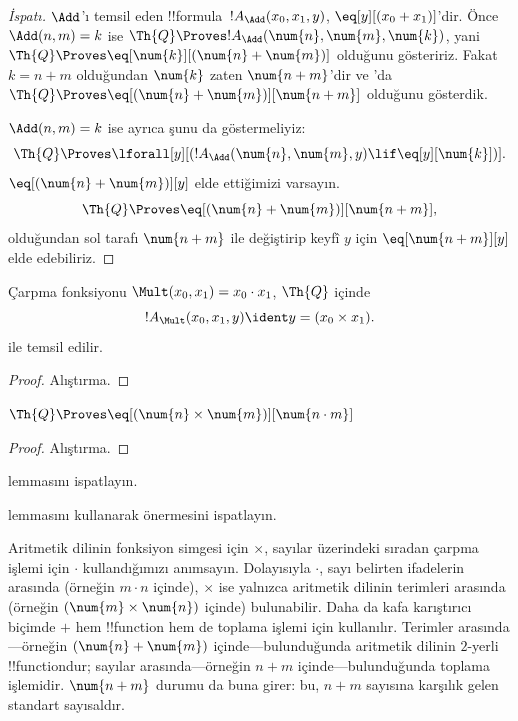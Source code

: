\documentclass[../../../include/open-logic-section]{subfiles}
\begin{document}
\begin{proof}[ İspatı]
$\Add$'ı temsil eden !!{formula}~$!A_\Add(x_0,x_1,y)$,
$\eq[y][(x_0+x_1)]$'dir. Önce $\Add(n,m)=k$ ise
$\Th{Q} \Proves !A_\Add(\num{n},\num{m},\num{k})$, yani
$\Th{Q} \Proves \eq[\num{k}][(\num{n}+\num{m})]$ olduğunu gösteririz.
Fakat $k=n+m$ olduğundan $\num{k}$ zaten $\num{n+m}$'dir ve
'da
$\Th{Q} \Proves \eq[(\num{n}+\num{m})][\num{n+m}]$ olduğunu gösterdik.

$\Add(n,m)=k$ ise ayrıca şunu da göstermeliyiz:
\[
\Th{Q} \Proves \lforall[y][(!A_\Add(\num{n}, \num{m}, y) \lif
  \eq[y][\num{k}])].
\]
$\eq[(\num{n}+\num{m})][y]$ elde ettiğimizi varsayın.
\[
\Th{Q} \Proves \eq[(\num{n}+\num{m})][\num{n+m}],
\]
olduğundan sol tarafı $\num{n+m}$ ile değiştirip keyfî $y$ için
$\eq[\num{n+m}][y]$ elde edebiliriz.
\end{proof}

\begin{prop}
Çarpma fonksiyonu $\Mult(x_0,x_1)=x_0\cdot x_1$, $\Th{Q}$ içinde
\[
  !A_{\Mult}(x_0, x_1, y) \ident y = (x_0 \times x_1).
\]
ile temsil edilir.
\end{prop}

\begin{proof} Alıştırma. \end{proof}

\begin{lem}
$\Th{Q} \Proves \eq[(\num{n} \times \num{m})][\num{n \cdot m}]$
\end{lem}

\begin{proof} Alıştırma. \end{proof}

\begin{prob}
 lemmasını ispatlayın.
\end{prob}

\begin{prob}
 lemmasını kullanarak
 önermesini ispatlayın.
\end{prob}

\begin{explain}
  Aritmetik dilinin fonksiyon simgesi için $\times$, sayılar üzerindeki
  sıradan çarpma işlemi için $\cdot$ kullandığımızı anımsayın. Dolayısıyla
  $\cdot$, sayı belirten ifadelerin arasında (örneğin $m\cdot n$ içinde),
  $\times$ ise yalnızca aritmetik dilinin terimleri arasında (örneğin
  $(\num{m}\times\num{n})$ içinde) bulunabilir. Daha da kafa karıştırıcı
  biçimde $+$ hem !!{function} hem de toplama işlemi için kullanılır.
  Terimler arasında---örneğin $(\num{n}+\num{m})$ içinde---bulunduğunda
  aritmetik dilinin $2$-yerli !!{function}{}dur; sayılar arasında---örneğin
  $n+m$ içinde---bulunduğunda toplama işlemidir. $\num{n+m}$ durumu da
  buna girer: bu, $n+m$ sayısına karşılık gelen standart sayısaldır.
\end{explain}
\end{document}
